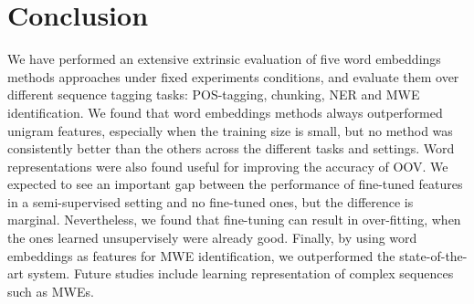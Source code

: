 \section{Conclusion}
We have performed an extensive extrinsic evaluation of five word embeddings methods approaches
under fixed experiments conditions, and evaluate them over different sequence tagging tasks: POS-tagging, chunking, NER and MWE identification.
We found that word embeddings methods always outperformed unigram features, especially when the training size is small, but no method was consistently better than the others across the different tasks and settings.
Word representations were also found useful for improving the accuracy of OOV.
We expected to see an important gap between the performance of fine-tuned features in a semi-supervised setting and no fine-tuned ones, but the difference is marginal.
Nevertheless, we found that fine-tuning can result in over-fitting, when the ones learned  unsupervisely were already good.   
Finally, by using word embeddings as features for MWE identification, we outperformed 
the state-of-the-art system.
Future studies include learning representation of complex sequences such as MWEs.


